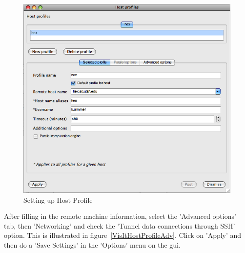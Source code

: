 \documentclass[12pt]{article}
\begin{document}
\begin{figure}

  \begin{center}
  \includegraphics[scale=0.20]{VisItHostProfile.png}
  \end{center}
  \caption{Setting up Host Profile}
  \label{VisItHostProfile}

\end{figure}


After filling in the remote machine information, select the 'Advanced
options' tab, then 'Networking' and check the 'Tunnel data connections
through SSH' option. This is illustrated in
figure~\ref{VisItHostProfileAdv}. Click on 'Apply' and then do a 'Save
Settings' in the 'Options' menu on the gui.
\end{document}

